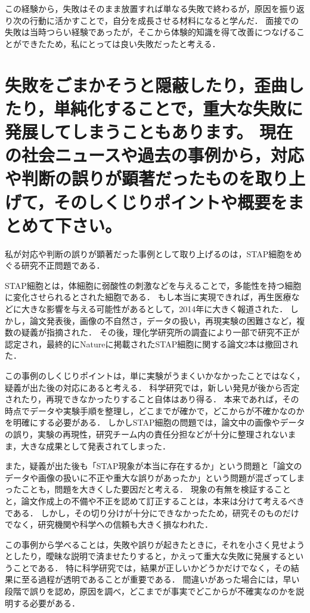 \documentclass[titlepage,a4paper]{jsarticle}
\begin{document}
この経験から，失敗はそのまま放置すれば単なる失敗で終わるが，原因を振り返り次の行動に活かすことで，自分を成長させる材料になると学んだ．
面接での失敗は当時つらい経験であったが，そこから体験的知識を得て改善につなげることができたため，私にとっては良い失敗だったと考える．


\section{失敗をごまかそうと隠蔽したり，歪曲したり，単純化することで，重大な失敗に発展してしまうこともあります。
現在の社会ニュースや過去の事例から，対応や判断の誤りが顕著だったものを取り上げて，そのしくじりポイントや概要をまとめて下さい。}

私が対応や判断の誤りが顕著だった事例として取り上げるのは，STAP細胞をめぐる研究不正問題である．

STAP細胞とは，体細胞に弱酸性の刺激などを与えることで，多能性を持つ細胞に変化させられるとされた細胞である．
もし本当に実現できれば，再生医療などに大きな影響を与える可能性があるとして，2014年に大きく報道された．
しかし，論文発表後，画像の不自然さ，データの扱い，再現実験の困難さなど，複数の疑義が指摘された．
その後，理化学研究所の調査により一部で研究不正が認定され，最終的にNatureに掲載されたSTAP細胞に関する論文2本は撤回された．

この事例のしくじりポイントは，単に実験がうまくいかなかったことではなく，疑義が出た後の対応にあると考える．
科学研究では，新しい発見が後から否定されたり，再現できなかったりすること自体はあり得る．
本来であれば，その時点でデータや実験手順を整理し，どこまでが確かで，どこからが不確かなのかを明確にする必要がある．
しかしSTAP細胞の問題では，論文中の画像やデータの誤り，実験の再現性，研究チーム内の責任分担などが十分に整理されないまま，大きな成果として発表されてしまった．

また，疑義が出た後も「STAP現象が本当に存在するか」という問題と「論文のデータや画像の扱いに不正や重大な誤りがあったか」という問題が混ざってしまったことも，問題を大きくした要因だと考える．
現象の有無を検証することと，論文作成上の不備や不正を認めて訂正することは，本来は分けて考えるべきである．
しかし，その切り分けが十分にできなかったため，研究そのものだけでなく，研究機関や科学への信頼も大きく損なわれた．

この事例から学べることは，失敗や誤りが起きたときに，それを小さく見せようとしたり，曖昧な説明で済ませたりすると，かえって重大な失敗に発展するということである．
特に科学研究では，結果が正しいかどうかだけでなく，その結果に至る過程が透明であることが重要である．
間違いがあった場合には，早い段階で誤りを認め，原因を調べ，どこまでが事実でどこからが不確実なのかを説明する必要がある．
\end{document}
